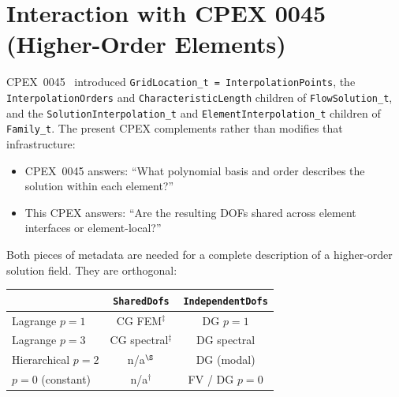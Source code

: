 \documentclass[11pt,letterpaper]{article}
\begin{document}
\section{Interaction with CPEX 0045 (Higher-Order Elements)}

CPEX~0045~\cite{cpex0045} introduced
\texttt{GridLocation\_t = InterpolationPoints}, the
\texttt{InterpolationOrders} and \texttt{CharacteristicLength} children
of \texttt{FlowSolution\_t}, and the
\texttt{SolutionInterpolation\_t} and \texttt{ElementInterpolation\_t}
children of \texttt{Family\_t}.  The present CPEX complements rather
than modifies that infrastructure:

\begin{itemize}[leftmargin=2em]
\item CPEX~0045 answers: ``What polynomial basis and order describes
  the solution within each element?''
\item This CPEX answers: ``Are the resulting DOFs shared across element
  interfaces or element-local?''
\end{itemize}

Both pieces of metadata are needed for a complete description of a
higher-order solution field.  They are orthogonal:

\begin{center}
\begin{tabular}{lcc}
\toprule
& \textbf{\texttt{SharedDofs}}
& \textbf{\texttt{IndependentDofs}} \\
\midrule
Lagrange $p=1$ & CG FEM$^{\ddagger}$ & DG $p=1$ \\
Lagrange $p=3$ & CG spectral$^{\ddagger}$ & DG spectral \\
Hierarchical $p=2$ & n/a$^{\S}$ & DG (modal) \\
$p=0$ (constant) & n/a$^{\dagger}$ & FV / DG $p=0$ \\
\bottomrule
\end{tabular}
\end{center}


\end{document}
